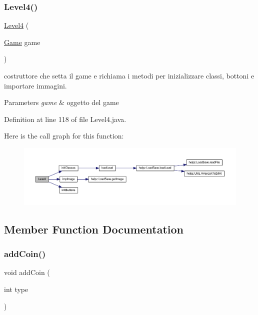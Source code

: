 \subsubsection{\texorpdfstring{Level4()}{Level4()}}
{\footnotesize\ttfamily \hyperlink{classscenes_1_1_level4}{Level4} (\begin{DoxyParamCaption}\item[{\hyperlink{classprogetto_1_1_game}{Game}}]{game }\end{DoxyParamCaption})}



costruttore che setta il game e richiama i metodi per inizializzare classi, bottoni e importare immagini. 


\begin{DoxyParams}{Parameters}
{\em game} & oggetto del game \\
\hline
\end{DoxyParams}


Definition at line 118 of file Level4.\+java.

Here is the call graph for this function\+:
\nopagebreak
\begin{figure}[H]
\begin{center}
\leavevmode
\includegraphics[width=350pt]{classscenes_1_1_level4_ace3453f4ef6ea220bef6de5f957e89d5_cgraph}
\end{center}
\end{figure}


\subsection{Member Function Documentation}
\mbox{\label{classscenes_1_1_level4_a9f0f7dc28e596d2ebcd06e27ef05d9fd}} 
\subsubsection{\texorpdfstring{add\+Coin()}{addCoin()}}
{\footnotesize\ttfamily void add\+Coin (\begin{DoxyParamCaption}\item[{int}]{type }\end{DoxyParamCaption})}




